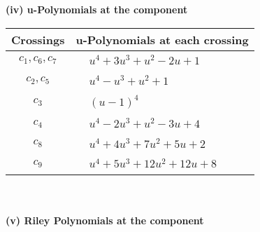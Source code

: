 \documentclass[1p]{elsarticle_modified}
\theoremstyle{definition}
\begin{document}
\newpage\renewcommand{\arraystretch}{1}
\flushleft \textbf{(iv) u-Polynomials at the component}\newline \\
\begin{tabular}{m{50pt}|m{274pt}}
Crossings & \hspace{64pt}u-Polynomials at each crossing \\
\hline $$\begin{aligned}c_{1},c_{6},c_{7}\end{aligned}$$&$\begin{aligned}
&u^4+3 u^3+u^2-2 u+1
\end{aligned}$\\
\hline $$\begin{aligned}c_{2},c_{5}\end{aligned}$$&$\begin{aligned}
&u^4- u^3+u^2+1
\end{aligned}$\\
\hline $$\begin{aligned}c_{3}\end{aligned}$$&$\begin{aligned}
&(u-1)^4
\end{aligned}$\\
\hline $$\begin{aligned}c_{4}\end{aligned}$$&$\begin{aligned}
&u^4-2 u^3+u^2-3 u+4
\end{aligned}$\\
\hline $$\begin{aligned}c_{8}\end{aligned}$$&$\begin{aligned}
&u^4+4 u^3+7 u^2+5 u+2
\end{aligned}$\\
\hline $$\begin{aligned}c_{9}\end{aligned}$$&$\begin{aligned}
&u^4+5 u^3+12 u^2+12 u+8
\end{aligned}$\\
\hline
\end{tabular}\\~\\
\newpage\renewcommand{\arraystretch}{1}
\flushleft \textbf{(v) Riley Polynomials at the component}\newline \\
\end{document}
